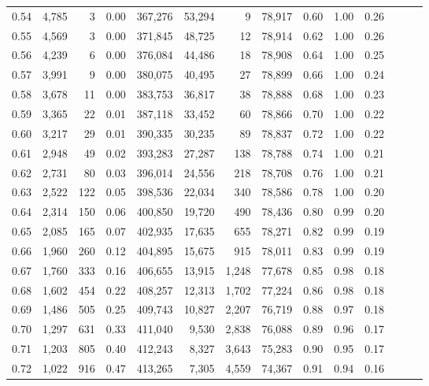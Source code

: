 \begin{tabular}{rrrrrrrrrrrrrr}
0.54 &  4,785 &      3 &  0.00 &  367,276 &   53,294 &       9 &  78,917 &  0.60 &  1.00 &      0.26 \\
0.55 &  4,569 &      3 &  0.00 &  371,845 &   48,725 &      12 &  78,914 &  0.62 &  1.00 &      0.26 \\
0.56 &  4,239 &      6 &  0.00 &  376,084 &   44,486 &      18 &  78,908 &  0.64 &  1.00 &      0.25 \\
0.57 &  3,991 &      9 &  0.00 &  380,075 &   40,495 &      27 &  78,899 &  0.66 &  1.00 &      0.24 \\
0.58 &  3,678 &     11 &  0.00 &  383,753 &   36,817 &      38 &  78,888 &  0.68 &  1.00 &      0.23 \\
0.59 &  3,365 &     22 &  0.01 &  387,118 &   33,452 &      60 &  78,866 &  0.70 &  1.00 &      0.22 \\
0.60 &  3,217 &     29 &  0.01 &  390,335 &   30,235 &      89 &  78,837 &  0.72 &  1.00 &      0.22 \\
0.61 &  2,948 &     49 &  0.02 &  393,283 &   27,287 &     138 &  78,788 &  0.74 &  1.00 &      0.21 \\
0.62 &  2,731 &     80 &  0.03 &  396,014 &   24,556 &     218 &  78,708 &  0.76 &  1.00 &      0.21 \\
0.63 &  2,522 &    122 &  0.05 &  398,536 &   22,034 &     340 &  78,586 &  0.78 &  1.00 &      0.20 \\
0.64 &  2,314 &    150 &  0.06 &  400,850 &   19,720 &     490 &  78,436 &  0.80 &  0.99 &      0.20 \\
0.65 &  2,085 &    165 &  0.07 &  402,935 &   17,635 &     655 &  78,271 &  0.82 &  0.99 &      0.19 \\
0.66 &  1,960 &    260 &  0.12 &  404,895 &   15,675 &     915 &  78,011 &  0.83 &  0.99 &      0.19 \\
0.67 &  1,760 &    333 &  0.16 &  406,655 &   13,915 &   1,248 &  77,678 &  0.85 &  0.98 &      0.18 \\
0.68 &  1,602 &    454 &  0.22 &  408,257 &   12,313 &   1,702 &  77,224 &  0.86 &  0.98 &      0.18 \\
0.69 &  1,486 &    505 &  0.25 &  409,743 &   10,827 &   2,207 &  76,719 &  0.88 &  0.97 &      0.18 \\
0.70 &  1,297 &    631 &  0.33 &  411,040 &    9,530 &   2,838 &  76,088 &  0.89 &  0.96 &      0.17 \\
0.71 &  1,203 &    805 &  0.40 &  412,243 &    8,327 &   3,643 &  75,283 &  0.90 &  0.95 &      0.17 \\
0.72 &  1,022 &    916 &  0.47 &  413,265 &    7,305 &   4,559 &  74,367 &  0.91 &  0.94 &      0.16 \\

\end{tabular}

